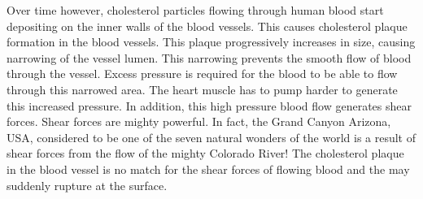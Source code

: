 Over time however, cholesterol particles flowing through human blood start depositing on the inner walls of the blood vessels. This causes cholesterol plaque formation in the blood vessels. This plaque progressively increases in size, causing narrowing of the vessel lumen. This narrowing prevents the smooth flow of blood through the vessel. Excess pressure is required for the blood to be able to flow through this narrowed area. The heart muscle has to pump harder to generate this increased pressure. In addition, this high pressure blood flow generates shear forces. Shear forces are mighty powerful. In fact, the Grand Canyon Arizona, USA, considered to be one of the seven natural wonders of the world is a result of shear forces from the flow of the mighty Colorado River! The cholesterol plaque in the blood vessel is no match for the shear forces of flowing blood and the may suddenly rupture at the surface.

